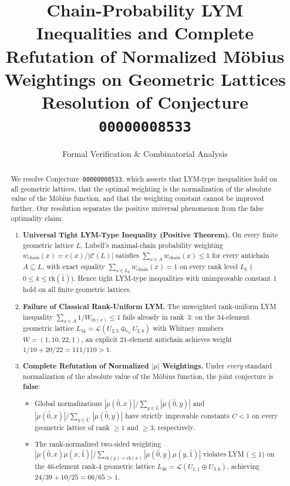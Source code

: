 \documentclass[11pt]{article}
\title{\textbf{Chain-Probability LYM Inequalities and Complete Refutation of Normalized M\"obius Weightings on Geometric Lattices}\\[0.5em]
\large Resolution of Conjecture \texttt{00000008533}}
\author{Formal Verification \& Combinatorial Analysis}
\date{}
\theoremstyle{definition}
\theoremstyle{remark}
\newcommand{\rk}{\mathrm{rk}}
\begin{document}
\maketitle

\begin{abstract}
We resolve Conjecture~\texttt{00000008533}, which asserts that LYM-type inequalities hold on all geometric lattices, that the optimal weighting is the normalization of the absolute value of the M\"obius function, and that the weighting constant cannot be improved further. Our resolution separates the positive universal phenomenon from the false optimality claim:
\begin{enumerate}
\item \textbf{Universal Tight LYM-Type Inequality (Positive Theorem).} On every finite geometric lattice $L$, Lubell's maximal-chain probability weighting $w_{\mathrm{chain}}(x) = c(x)/|\mathcal{C}(L)|$ satisfies $\sum_{x \in A} w_{\mathrm{chain}}(x) \le 1$ for every antichain $A \subseteq L$, with exact equality $\sum_{x \in L_k} w_{\mathrm{chain}}(x) = 1$ on every rank level $L_k$ ($0 \le k \le \rk(\hat{1})$). Hence tight LYM-type inequalities with unimprovable constant $1$ hold on all finite geometric lattices.
\item \textbf{Failure of Classical Rank-Uniform LYM.} The unweighted rank-uniform LYM inequality $\sum_{x \in A} 1/W_{\rk(x)} \le 1$ fails already in rank~$3$: on the $34$-element geometric lattice $L_{34} = \mathcal{L}(U_{2,5} \oplus_{e_0} U_{2,6})$ with Whitney numbers $W = (1, 10, 22, 1)$, an explicit $21$-element antichain achieves weight $1/10 + 20/22 = 111/110 > 1$.
\item \textbf{Complete Refutation of Normalized $|\mu|$ Weightings.} Under \emph{every} standard normalization of the absolute value of the M\"obius function, the joint conjecture is \textbf{false}:
  \begin{itemize}
  \item Global normalizations $|\mu(\hat{0}, x)| / \sum_{y \in L} |\mu(\hat{0}, y)|$ and $|\mu(\hat{0}, x)| / \sum_{y \in L^\circ} |\mu(\hat{0}, y)|$ have strictly improvable constants $C < 1$ on every geometric lattice of rank $\ge 1$ and $\ge 3$, respectively.
  \item The rank-normalized two-sided weighting $|\mu(\hat{0}, x)\mu(x, \hat{1})| / \sum_{\rk(y)=\rk(x)} |\mu(\hat{0}, y)\mu(y, \hat{1})|$ violates LYM ($\le 1$) on the $46$-element rank-$4$ geometric lattice $L_{46} = \mathcal{L}(U_{1,1} \oplus U_{3,6})$, achieving $24/39 + 10/25 = 66/65 > 1$.

\end{itemize}
\end{enumerate}
\end{abstract}
\end{document}
